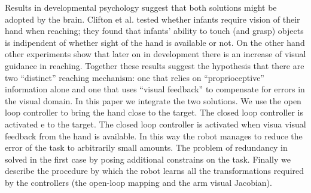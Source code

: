 Results in developmental psychology suggest that both solutions might be
adopted by the brain. Clifton et al. \cite{clifton93isvisually} 
tested whether infants require vision of their hand when reaching; they 
found that infants' ability to touch (and grasp) objects is indipendent 
of whether sight of the hand is available or not. On the other hand 
other experiments \cite{ashmead93visual}
show that later on in development there is an increase of visual guidance 
in reaching. Together these results suggest the hypothesis that there 
are two ``distinct'' reaching mechanism: one that relies on ``proprioceptive'' 
information alone and one that uses ``visual feedback'' to compensate 
for errors in the visual domain.
In this paper we integrate the two solutions. We use the open loop
controller to bring the hand close to the target. The closed loop controller 
is activated e to the target. The closed loop controller 
is activated when visua visual feedback from the hand is available. In this
way the robot manages to reduce the error of the task to arbitrarily small 
amounts. The problem of redundancy in solved in the first case by posing 
additional constrains on the task. Finally we describe the procedure by 
which the robot learns all the transformations required by the controllers 
(the open-loop mapping and the arm visual Jacobian).